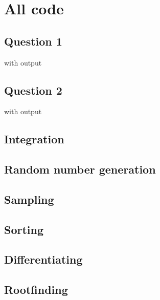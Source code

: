 \section{All code}
\subsection{Question 1}

with output


\subsection{Question 2}

with output


\subsection{Integration}


\subsection{Random number generation}


\subsection{Sampling}


\subsection{Sorting}


\subsection{Differentiating}


\subsection{Rootfinding}
